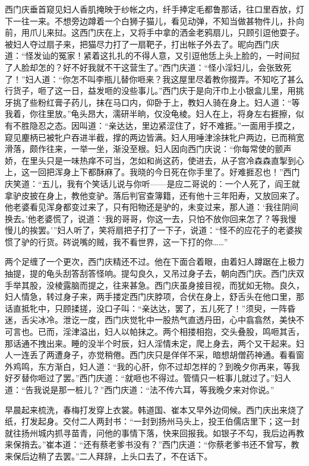 西门庆垂首窥见妇人香肌掩映于纱帐之内，纤手捧定毛都鲁那话，往口里吞放，灯下一往一来。不想旁边蹲着一个白狮子猫儿，看见动弹，不知当做甚物件儿，扑向前，用爪儿来挝。这西门庆在上，又将手中拿的洒金老鸦扇儿，只顾引逗他耍子。被妇人夺过扇子来，把猫尽力打了一扇靶子，打出帐子外去了。昵向西门庆道：“怪发讪的冤家！紧着这扎扎的不得人意，又引逗他恁上头上脸的，一时间挝了人脸却怎的？好不好我就不干这营生了。”西门庆道：“怪小淫妇儿，会张致死了！”妇人道：“你怎不叫李瓶儿替你咂来？我这屋里尽着教你掇弄。不知吃了甚么行货子，咂了这一日，益发咂的没些事儿。”西门庆于是向汗巾上小银盒儿里，用挑牙挑了些粉红膏子药儿，抹在马口内，仰卧于上，教妇人骑在身上。妇人道：“等我着，你往里放。”龟头昂大，濡研半晌，仅没龟棱。妇人在上，将身左右捱擦，似有不胜隐忍之态。因叫道：“亲达达，里边紧涩住了，好不难捱。”一面用手摸之，窥见麈柄已被牝户吞进半截，撑的两边皆满。妇人用唾津涂抹牝户两边，已而稍宽滑落，颇作往来，一举一坐，渐没至根。妇人因向西门庆说：“你每常使的颤声娇，在里头只是一味热痒不可当，怎如和尚这药，使进去，从子宫冷森森直掣到心上，这一回把浑身上下都酥麻了。我晓的今日死在你手里了。好难捱忍也！”西门庆笑道：“五儿，我有个笑话儿说与你听——是应二哥说的：一个人死了，阎王就拿驴皮披在身上，教他变驴。落后判官查簿籍，还有他十三年阳寿，又放回来了。他老婆看见浑身都变过来了，只有阳物还是驴的，未变过来，那人道：‘我往阴间换去。’他老婆慌了，说道：‘我的哥哥，你这一去，只怕不放你回来怎了？等我慢慢儿的挨罢。’”妇人听了，笑将扇把子打了一下子，说道：“怪不的应花子的老婆挨惯了驴的行货。硶说嘴的贼，我不看世界，这一下打的你……”

两个足缠了一个更次，西门庆精还不过。他在下面合着眼，由着妇人蹲踞在上极力抽提，提的龟头刮答刮答怪响。提勾良久，又吊过身子去，朝向西门庆。西门庆双手举其股，没棱露脑而提之，往来甚急。西门庆虽身接目视，而犹如无物。良久，妇人情急，转过身子来，两手搂定西门庆脖项，合伏在身上，舒舌头在他口里，那话直抵牝中，只顾揉搓，没口子叫：“亲达达，罢了，五儿死了！”须臾，一阵昏迷，舌尖冰冷。泄讫一度，西门庆觉牝中一股热气直透丹田，心中翕翕然，美快不可言也。已而，淫津溢出，妇人以帕抹之。两个相搂相抱，交头叠股，鸣咂其舌，那话通不拽出来。睡的没半个时辰，妇人淫情未定，爬上身去，两个又干起来。妇人一连丢了两遭身子，亦觉稍倦。西门庆只是佯佯不采，暗想胡僧药神通。看看窗外鸡鸣，东方渐白，妇人道：“我的心肝，你不过却怎样的？到晚夕你再来，等我好歹替你咂过了罢。”西门庆道：“就咂也不得过。管情只一桩事儿就过了。”妇人道：“告我说是那一桩儿？”西门庆道：“法不传六耳，等我晚夕来对你说。”

早晨起来梳洗，春梅打发穿上衣裳。韩道国、崔本又早外边伺候。西门庆出来烧了纸，打发起身。交付二人两封书：“一封到扬州马头上，投王伯儒店里下；这一封就往扬州城内抓寻苗青，问他的事情下落，快来回报我。如银子不勾，我后边再教来保捎去。”崔本道：“还有蔡老爹书没有？”西门庆道：“你蔡老爹书还不曾写，教来保后边稍了去罢。”二人拜辞，上头口去了，不在话下。

